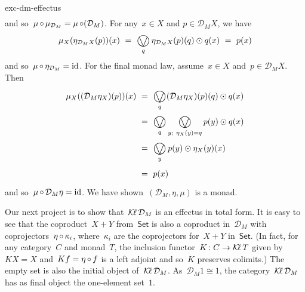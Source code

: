 \begin{solution}{exc-dm-effectus}
\begin{align*}
\end{align*}
    and so~$\mu \mathop{\circ} \mu_{\mathcal{D}_M} = \mu \mathop{\circ} (\mathcal{D}_M )$.
For any~$x \in X$ and $p \in \mathcal{D}_M X$, we have
\begin{equation*}
    \mu_X (\eta_{\mathcal{D}_M X}(p))(x)
    \ = \ \bigovee_q \eta_{\mathcal{D}_M X}(p)(q) \odot q(x) \ = \ p(x)
\end{equation*}
and so~$\mu \mathop{\circ} \eta_{\mathcal{D}_M} = \mathrm{id}$.
For the final monad law, assume~$x \in X$ and~$p \in \mathcal{D}_M X$.
Then
\begin{align*}
    \mu_X( (\mathcal{D}_M \eta_X)(p))(x)
    & \ = \ \bigovee_q (\mathcal{D}_M \eta_X) (p)(q) \odot q(x) \\
    & \ = \ \bigovee_q \bigovee_{y; \ \eta_X(y)=q}
            p(y) \odot q(x) \\
    & \ = \ \bigovee_y p(y) \odot \eta_X (y)(x) \\
    & \ = \ p(x)
\end{align*}
and so~$\mu \mathop{\circ} \mathcal{D}_M \eta = \mathrm{id}$.
We have shown~$(\mathcal{D}_M, \eta, \mu)$ is a monad.

Our next project is to show that~$\operatorname{\mathcal{K}\!\ell} \mathcal{D}_M$ is an effectus
    in total form.
It is easy to see that the coproduct~$X + Y$ from~$\mathsf{Set}$
    is also a coproduct in~$\mathcal{D}_M$
        with coprojectors~$\eta\mathop{\circ}\kappa_i$,
            where~$\kappa_i$ are the coprojectors for~$X+Y$ in~$\mathsf{Set}$.
(In fact, for any category~$C$ and monad~$T$,
    the inclusion functor~$K\colon C \to \operatorname{\mathcal{K}\!\ell} T$
        given by~$K X = X$ and~$K f = \eta \mathop{\circ} f$
        is a left adjoint and so~$K$ preserves colimits.)
The empty set is also the initial object of~$\operatorname{\mathcal{K}\!\ell} \mathcal{D}_M$.
As~$\mathcal{D}_M 1 \cong 1$,
    the category~$\operatorname{\mathcal{K}\!\ell} \mathcal{D}_M$
        has as final object the one-element set~$1$.


\end{solution}
